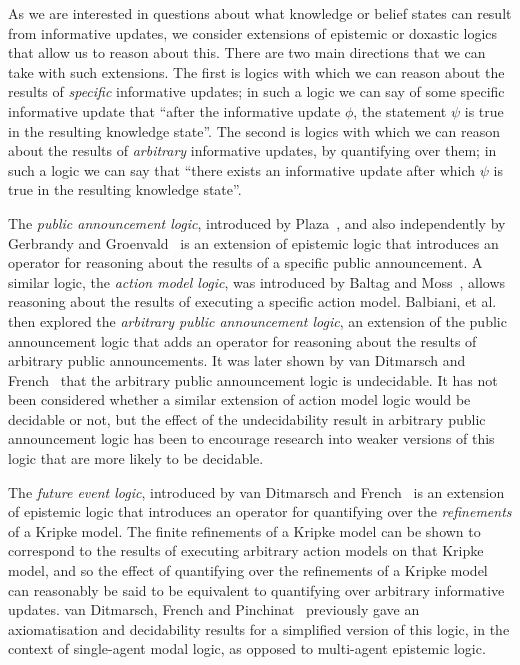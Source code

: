 As we are interested in questions about what knowledge or belief states can
result from informative updates, we consider extensions of epistemic or doxastic
logics that allow us to reason about this. There are two main directions that we
can take with such extensions. The first is logics with which we can reason
about the results of {\em specific} informative updates; in such a logic we can
say of some specific informative update that ``after the informative update
$\phi$, the statement $\psi$ is true in the resulting knowledge state''. The
second is logics with which we can reason about the results of {\em arbitrary}
informative updates, by quantifying over them; in such a logic we can say
that ``there exists an informative update after which $\psi$ is true in the
resulting knowledge state''.

The {\em public announcement logic}, introduced by
Plaza~\cite{plaza2007logics}, and also independently by Gerbrandy and
Groenvald~\cite{gerbrandy1997reasoning} is an extension of epistemic logic that
introduces an operator for reasoning about the results of a specific public
announcement. A similar logic, the {\em action model logic}, was introduced by
Baltag and Moss~\cite{baltag2004logics}, allows reasoning about the results of
executing a specific action model. Balbiani, et
al.~\cite{balbiani2007arbitrary} then explored the {\em arbitrary public
announcement logic}, an extension of the public announcement logic that adds an
operator for reasoning about the results of arbitrary public announcements.  It
was later shown by van Ditmarsch and French~\cite{french2008undecidability}
that the arbitrary public announcement logic is undecidable. It has not been
considered whether a similar extension of action model logic would be decidable
or not, but the effect of the undecidability result in arbitrary public
announcement logic has been to encourage research into weaker versions of this
logic that are more likely to be decidable.

The {\em future event logic}, introduced by van Ditmarsch and
French~\cite{french2009simulation} is an extension of epistemic logic that
introduces an operator for quantifying over the {\em refinements} of a Kripke
model. The finite refinements of a Kripke model can be shown to correspond to
the results of executing arbitrary action models on that Kripke model, and so
the effect of quantifying over the refinements of a Kripke model can reasonably
be said to be equivalent to quantifying over arbitrary informative updates. van
Ditmarsch, French and Pinchinat~\cite{french2010future} previously gave an
axiomatisation and decidability results for a simplified version of this logic,
in the context of single-agent modal logic, as opposed to multi-agent epistemic
logic.

